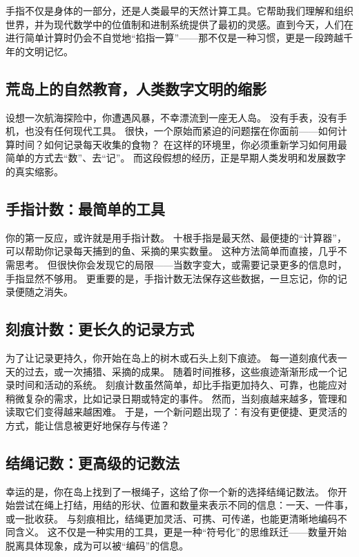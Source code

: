 手指不仅是身体的一部分，还是人类最早的天然计算工具。它帮助我们理解和组织世界，并为现代数学中的位值制和进制系统提供了最初的灵感。直到今天，人们在进行简单计算时仍会不自觉地“掐指一算”——那不仅是一种习惯，更是一段跨越千年的文明记忆。

\subsection{荒岛上的自然教育，人类数字文明的缩影}

设想一次航海探险中，你遭遇风暴，不幸漂流到一座无人岛。  
没有手表，没有手机，也没有任何现代工具。  
很快，一个原始而紧迫的问题摆在你面前——如何计算时间？如何记录每天收集的食物？  
在这样的环境里，你必须重新学习如何用最简单的方式去“数”、去“记”。  
而这段假想的经历，正是早期人类发明和发展数字的真实缩影。

\subsection*{手指计数：最简单的工具}
你的第一反应，或许就是用手指计数。  
十根手指是最天然、最便捷的“计算器”，可以帮助你记录每天捕到的鱼、采摘的果实数量。  
这种方法简单而直接，几乎不需思考。  
但很快你会发现它的局限——当数字变大，或需要记录更多的信息时，手指显然不够用。  
更重要的是，手指计数无法保存这些数据，一旦忘记，你的记录便随之消失。

\subsection*{刻痕计数：更长久的记录方式}

为了让记录更持久，你开始在岛上的树木或石头上刻下痕迹。  
每一道刻痕代表一天的过去，或一次捕猎、采摘的成果。  
随着时间推移，这些痕迹渐渐形成一个记录时间和活动的系统。  
刻痕计数虽然简单，却比手指更加持久、可靠，也能应对稍微复杂的需求，比如记录日期或特定的事件。  
然而，当刻痕越来越多，管理和读取它们变得越来越困难。  
于是，一个新问题出现了：有没有更便捷、更灵活的方式，能让信息被更好地保存与传递？  

\subsection*{结绳记数：更高级的记数法}
幸运的是，你在岛上找到了一根绳子，这给了你一个新的选择结绳记数法。  
你开始尝试在绳上打结，用结的形状、位置和数量来表示不同的信息：一天、一件事，或一批收获。  
与刻痕相比，结绳更加灵活、可携、可传递，也能更清晰地编码不同含义。  
这不仅是一种实用的工具，更是一种“符号化”的思维跃迁——数量开始脱离具体现象，成为可以被“编码”的信息。  

